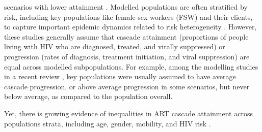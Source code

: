 scenarios with lower attainment \cite{Knight2022sr}.
Modelled populations are often stratified by risk,
including key populations like female sex workers (FSW) and their clients,
to capture important epidemic dynamics related to risk heterogeneity
\cite{Stigum1994,Garnett1996,Watts2010}.
However, these studies generally assume that cascade
attainment (\ie proportions of people living with HIV who are diagnosed, treated, and virally suppressed) or
progression (\ie rates of diagnosis, treatment initiation, and viral suppression)
are equal across modelled subpopulations.
For example, among the modelling studies in a recent review \cite{Knight2022sr},
key populations were usually assumed to have average cascade progression,
or above average progression in some scenarios, but never below average,
as compared to the population overall.
\par
Yet, there is growing evidence of inequalities in ART cascade attainment across populations strata,
including age, gender, mobility, and HIV risk \cite{Hakim2018,Green2020}.
